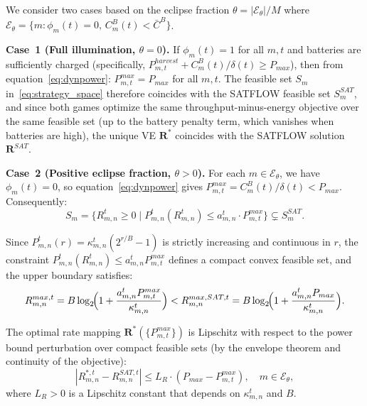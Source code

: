 \documentclass[journal]{IEEEtran}
\newcommand{\CB}{C^{B}}
\newcommand{\Pmax}{P_{max}}
\newcommand{\bfR}{\mathbf{R}}
\begin{document}
\begin{IEEEproof}
We consider two cases based on the eclipse fraction $\theta = |\mathcal{E}_\theta|/M$ where $\mathcal{E}_\theta = \{m : \phi_m(t)=0,\,
\CB_m(t) < \bar{C}^B\}$.

\smallskip
\noindent\textbf{Case~1 (Full illumination,
$\theta = 0$).} If $\phi_m(t) = 1$ for all $m, t$ and batteries are sufficiently charged (specifically, $P_{m,t}^{harvest} + \CB_m(t)/\delta(t)
\geq \Pmax$), then from
equation~\eqref{eq:dynpower}: $P_{m,t}^{max} = \Pmax$ for all $m, t$. The feasible set $S_m$ in~\eqref{eq:strategy_space} therefore coincides with the SATFLOW feasible set $S_m^{SAT}$, and since both games optimize the same throughput-minus-energy objective over the same feasible set (up to the battery penalty term, which vanishes when batteries are high), the unique VE $\bfR^*$ coincides with the SATFLOW solution $\bfR^{SAT}$.

\smallskip
\noindent\textbf{Case~2 (Positive eclipse fraction,
$\theta > 0$).} For each $m \in \mathcal{E}_\theta$, we have $\phi_m(t) = 0$, so equation~\eqref{eq:dynpower} gives $P_{m,t}^{max} = \CB_m(t)/\delta(t) < \Pmax$. Consequently:
\begin{equation}
    S_m = \bigl\{R_{m,n}^t \geq 0 \mid
    P_{m,n}^t(R_{m,n}^t) \leq
    a_{m,n}^t \cdot P_{m,t}^{max}\bigr\}
    \subsetneq
    S_m^{SAT}.
\end{equation}

Since $P_{m,n}^t(r) = \kappa_{m,n}^t(2^{r/B}-1)$ is strictly increasing and continuous in $r$, the constraint $P_{m,n}^t(R_{m,n}^t) \leq a_{m,n}^t P_{m,t}^{max}$ defines a compact convex feasible set, and the upper boundary satisfies:
\begin{equation}
    R_{m,n}^{max,t}
    = B\log_2\!\Bigl(1 +
    \frac{a_{m,n}^t P_{m,t}^{max}}%
    {\kappa_{m,n}^t}\Bigr)
    < R_{m,n}^{max,SAT,t}
    = B\log_2\!\Bigl(1 +
    \frac{a_{m,n}^t \Pmax}%
    {\kappa_{m,n}^t}\Bigr).
\end{equation}

The optimal rate mapping $\bfR^*(\{P_{m,t}^{max}\})$ is Lipschitz with respect to the power bound perturbation over compact feasible sets (by the envelope theorem and continuity of the objective):
\begin{equation}
    |R_{m,n}^{*,t} - R_{m,n}^{SAT,t}|
    \leq L_R \cdot (\Pmax - P_{m,t}^{max}),
    \quad m \in \mathcal{E}_\theta,
    \label{eq:lipschitz_rate}
\end{equation}
where $L_R > 0$ is a Lipschitz constant that depends on $\kappa_{m,n}^t$ and $B$.


\end{IEEEproof}
\end{document}
